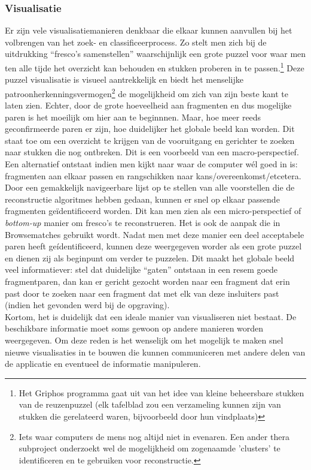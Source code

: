 \subsubsection{Visualisatie}
Er zijn vele visualisatiemanieren denkbaar die elkaar kunnen aanvullen bij het volbrengen van het zoek- en classificeerprocess. Zo stelt men zich bij de uitdrukking ``fresco's samenstellen'' waarschijnlijk een grote puzzel voor waar men ten alle tijde het overzicht kan behouden en stukken proberen in te passen.\footnote{Het Griphos programma gaat uit van het idee van kleine beheersbare stukken van de reuzenpuzzel (elk tafelblad zou een verzameling kunnen zijn van stukken die gerelateerd waren, bijvoorbeeld door hun vindplaats)} Deze puzzel visualisatie is visueel aantrekkelijk en biedt het menselijke patroonherkenningsvermogen\footnote{Iets waar computers de mens nog altijd niet in evenaren. Een ander thera subproject onderzoekt wel de mogelijkheid om zogenaamde 'clusters' te identificeren en te gebruiken voor reconstructie.} de mogelijkheid om zich van zijn beste kant te laten zien. Echter, door de grote hoeveelheid aan fragmenten en dus mogelijke paren is het moeilijk om hier aan te beginnnen. Maar, hoe meer reeds geconfirmeerde paren er zijn, hoe duidelijker het globale beeld kan worden. Dit staat toe om een overzicht te krijgen van de vooruitgang en gerichter te zoeken naar stukken die nog ontbreken. Dit is een voorbeeld van een macro-perspectief.\\

Een alternatief ontstaat indien men kijkt naar waar de computer w\'el goed in is: fragmenten aan elkaar passen en rangschikken naar kans/overeenkomst/etcetera. Door een gemakkelijk navigeerbare lijst op te stellen van alle voorstellen die de reconstructie algoritmes hebben gedaan, kunnen er snel op elkaar passende fragmenten ge\"identificeerd worden. Dit kan men zien als een micro-perspectief of \emph{bottom-up} manier om fresco's te reconstrueren. Het is ook de aanpak die in Browsematches gebruikt wordt. Nadat men met deze manier een deel acceptabele paren heeft ge\'identificeerd, kunnen deze weergegeven worder als een grote puzzel en dienen zij als beginpunt om verder te puzzelen. Dit maakt het globale beeld veel informatiever: stel dat duidelijke ``gaten'' ontstaan in een resem goede fragmentparen, dan kan er gericht gezocht worden naar een fragment dat erin past door te zoeken naar een fragment dat met elk van deze insluiters past (indien het gevonden werd bij de opgraving).\\

Kortom, het is duidelijk dat een ideale manier van visualiseren niet bestaat. De beschikbare informatie moet soms gewoon op andere manieren worden weergegeven. Om deze reden is het wenselijk om het mogelijk te maken snel nieuwe visualisaties in te bouwen die kunnen communiceren met andere delen van de applicatie en eventueel de informatie manipuleren. 